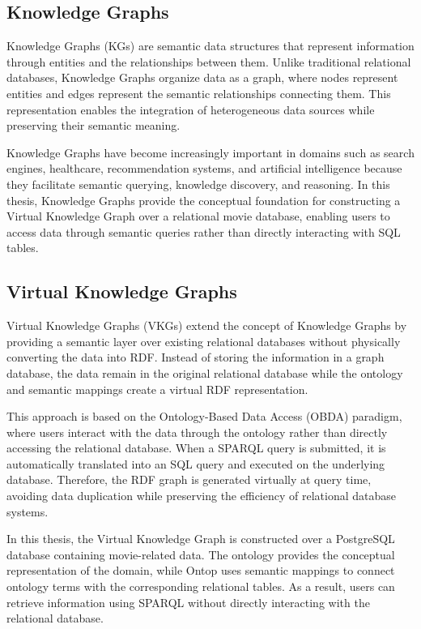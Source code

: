 \subsection{Knowledge Graphs}
Knowledge Graphs (KGs) are semantic data structures that represent information through entities and the relationships between them. Unlike traditional relational databases, Knowledge Graphs organize data as a graph, where nodes represent entities and edges represent the semantic relationships connecting them. This representation enables the integration of heterogeneous data sources while preserving their semantic meaning.

Knowledge Graphs have become increasingly important in domains such as search engines, healthcare, recommendation systems, and artificial intelligence because they facilitate semantic querying, knowledge discovery, and reasoning. In this thesis, Knowledge Graphs provide the conceptual foundation for constructing a Virtual Knowledge Graph over a relational movie database, enabling users to access data through semantic queries rather than directly interacting with SQL tables.
\subsection{Virtual Knowledge Graphs}
Virtual Knowledge Graphs (VKGs) extend the concept of Knowledge Graphs by providing a semantic layer over existing relational databases without physically converting the data into RDF. Instead of storing the information in a graph database, the data remain in the original relational database while the ontology and semantic mappings create a virtual RDF representation.

This approach is based on the Ontology-Based Data Access (OBDA) paradigm, where users interact with the data through the ontology rather than directly accessing the relational database. When a SPARQL query is submitted, it is automatically translated into an SQL query and executed on the underlying database. Therefore, the RDF graph is generated virtually at query time, avoiding data duplication while preserving the efficiency of relational database systems.

In this thesis, the Virtual Knowledge Graph is constructed over a PostgreSQL database containing movie-related data. The ontology provides the conceptual representation of the domain, while Ontop uses semantic mappings to connect ontology terms with the corresponding relational tables. As a result, users can retrieve information using SPARQL without directly interacting with the relational database.

